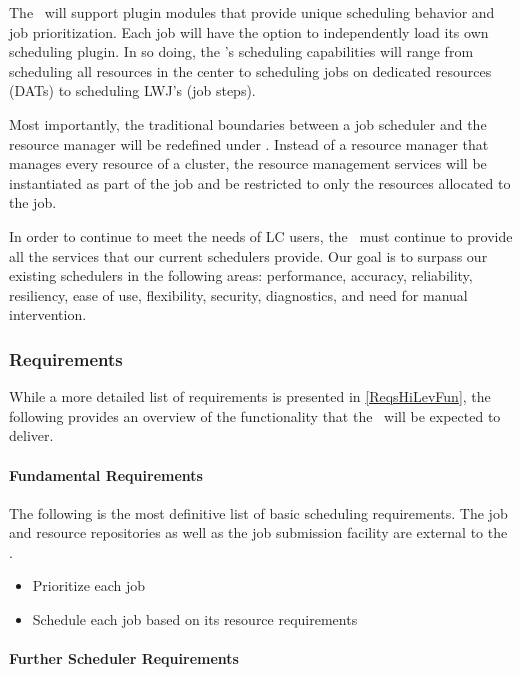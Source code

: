 The \ngjs\ will support plugin modules that provide unique scheduling
behavior and job prioritization.  Each job will have the option to
independently load its own scheduling plugin.  In so doing, the
\ngjs's scheduling capabilities will range from scheduling all
resources in the center to scheduling jobs on dedicated resources
(DATs) to scheduling LWJ's (job steps).

Most importantly, the traditional boundaries between a job scheduler
and the resource manager will be redefined under \ngrm.  Instead of a
resource manager that manages every resource of a cluster, the
resource management services will be instantiated as part of the job
and be restricted to only the resources allocated to the job.

In order to continue to meet the needs of LC users, the \ngjs\ must
continue to provide all the services that our current schedulers
provide.  Our goal is to surpass our existing schedulers in the
following areas: performance, accuracy, reliability, resiliency, ease
of use, flexibility, security, diagnostics, and need for manual
intervention.

\subsubsection{Requirements}

While a more detailed list of requirements is presented in
\ref{ReqsHiLevFun}, the following provides an overview of the
functionality that the \ngjs\ will be expected to deliver.

\paragraph{Fundamental Requirements}

The following is the most definitive list of basic scheduling
requirements.  The job and resource repositories as well as the job
submission facility are external to the \ngjs.

\begin{itemize}
  \item Prioritize each job
  \item Schedule each job based on its resource requirements
\end{itemize}

\paragraph{Further Scheduler Requirements}

